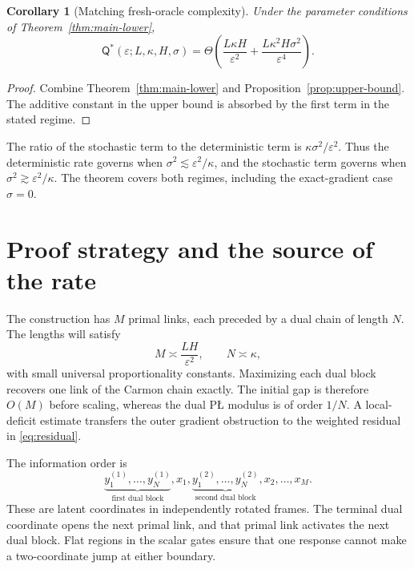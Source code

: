 \documentclass[11pt,a4paper]{article}
\newcommand{\eps}{\varepsilon}
\newtheorem{corollary}[theorem]{Corollary}
\theoremstyle{definition}
\theoremstyle{remark}
\numberwithin{equation}{section}
\begin{document}
\begin{corollary}[Matching fresh-oracle complexity]
\label{cor:matching}
Under the parameter conditions of Theorem~\ref{thm:main-lower},
\begin{equation}
 \mathsf Q^*(\eps;L,\kappa,H,\sigma)
 =\Theta\!\left(\frac{L\kappa H}{\eps^2}
                  +\frac{L\kappa^2H\sigma^2}{\eps^4}\right).
 \label{eq:matching-rate}
\end{equation}
\end{corollary}

\begin{proof}
Combine Theorem~\ref{thm:main-lower} and
Proposition~\ref{prop:upper-bound}. The additive constant in the upper
bound is absorbed by the first term in the stated regime.
\end{proof}

The ratio of the stochastic term to the deterministic term is
$\kappa\sigma^2/\eps^2$. Thus the deterministic rate governs when
$\sigma^2\lesssim\eps^2/\kappa$, and the stochastic term governs
when $\sigma^2\gtrsim\eps^2/\kappa$. The theorem covers both regimes,
including the exact-gradient case $\sigma=0$.

\section{Proof strategy and the source of the rate}
\label{sec:overview}

The construction has $M$ primal links, each preceded by a dual chain
of length $N$. The lengths will satisfy
\[
 M\asymp\frac{LH}{\eps^2},\qquad N\asymp\kappa,
\]
with small universal proportionality constants. Maximizing each dual
block recovers one link of the Carmon chain exactly. The initial gap
is therefore $O(M)$ before scaling, whereas the dual P\L{} modulus
is of order $1/N$. A local-deficit estimate transfers the outer
gradient obstruction to the weighted residual in
\eqref{eq:residual}.

The information order is
\[
 \underbrace{y^{(1)}_1,\ldots,y^{(1)}_N}_{\text{first dual block}},x_1,
 \underbrace{y^{(2)}_1,\ldots,y^{(2)}_N}_{\text{second dual block}},x_2,
 \ldots,x_M.
\]
These are latent coordinates in independently rotated frames. The
terminal dual coordinate opens the next primal link, and that primal
link activates the next dual block. Flat regions in the scalar gates
ensure that one response cannot make a two-coordinate jump at either
boundary.
\end{document}
